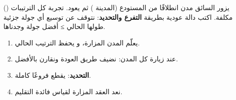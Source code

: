 \begin{statement}
يزور السائق  مدن انطلاقًا من المستودع (المدينة ) ثم يعود. تجربة كل الترتيبات () مكلفة. اكتب دالة عودية  بطريقة \textbf{التفرع والتحديد}: نتوقف عن توسيع أي جولة جزئية طولها الحالي ≥ أفضل جولة وجدناها.
\end{statement}
\begin{stepsbox}\begin{enumerate}
\item {} يعلّم المدن المزارة، و  يحفظ الترتيب الحالي.
\item عند زيارة كل المدن: نضيف طريق العودة ونقارن بالأفضل.
\item \textbf{التحديد}:  يقطع فروعًا كاملة.
\item نعد العقد المزارة لقياس فائدة التقليم.
\end{enumerate}\end{stepsbox}
